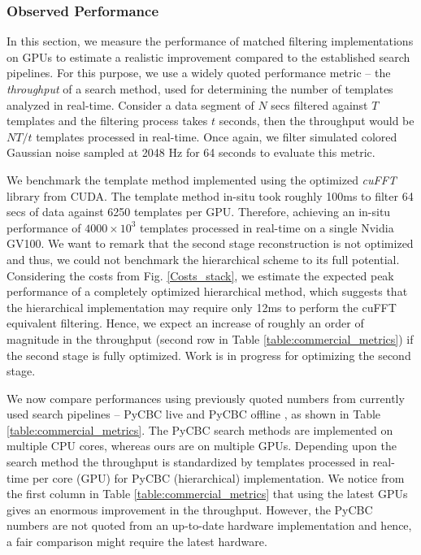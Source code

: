 \subsubsection{Observed Performance}
In this section, we measure the performance of matched filtering implementations on GPUs to estimate a realistic improvement compared to the established search pipelines. For this purpose, we use a widely quoted performance metric -- the \textit{throughput} of a search method, used for determining the number of templates analyzed in real-time. Consider a data segment of $N$ secs filtered against $T$ templates and the filtering process takes $t$ seconds, then the throughput would be $NT/t$ templates processed in real-time. Once again, we filter simulated colored Gaussian noise sampled at 2048 Hz for 64 seconds to evaluate this metric.

We benchmark the template method implemented using the optimized \textit{cuFFT} library from CUDA. The template method in-situ took roughly 100ms to filter 64 secs of data against 6250 templates per GPU. Therefore, achieving an in-situ performance of $4000 \times 10^3$ templates processed in real-time on a single Nvidia GV100. We want to remark that the second stage reconstruction is not optimized and thus, we could not benchmark the hierarchical scheme to its full potential. Considering the costs from Fig. \ref{Costs_stack}, we estimate the expected peak performance of a completely optimized hierarchical method, which suggests that the hierarchical implementation may require only 12ms to perform the cuFFT equivalent filtering. Hence, we expect an increase of roughly an order of magnitude in the throughput  (second row in Table \ref{table:commercial_metrics}) if the second stage is fully optimized. Work is in progress for optimizing the second stage.  

We now compare performances using previously quoted numbers from currently used search pipelines -- PyCBC live \cite{pycbc-live} and PyCBC offline \cite{pycbc_offline}, as shown in Table \ref{table:commercial_metrics}. The PyCBC search methods are implemented on multiple CPU cores, whereas ours are on multiple GPUs. Depending upon the search method the throughput is standardized by templates processed in real-time per core (GPU) for PyCBC (hierarchical) implementation. We notice from the first column in Table \ref{table:commercial_metrics} that using the latest GPUs gives an enormous improvement in the throughput. However, the PyCBC numbers are not quoted from an up-to-date hardware implementation and hence, a fair comparison might require the latest hardware. 

